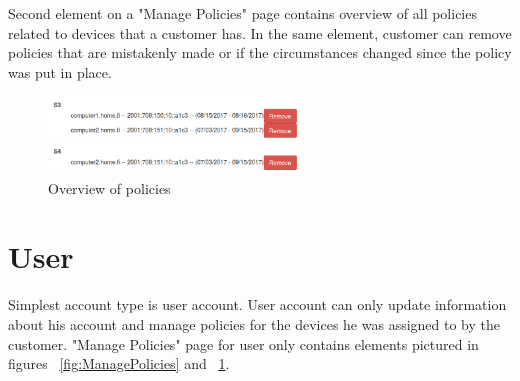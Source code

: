 Second element on a "Manage Policies" page contains overview of all policies related to devices that a customer has. In the same element, customer can remove policies that are mistakenly made or if the circumstances changed since the policy was put in place.

\begin{figure}[ht]
	\begin{center}
		\includegraphics[width=0.6\textwidth]{images/implementation/PolicyOverview}
		\caption{Overview of policies}
		\label{fig:PolicyOverview}
	\end{center}
\end{figure}

\section{User}

Simplest account type is user account. User account can only update information about his account and manage policies for the devices he was assigned to by the customer. "Manage Policies" page for user only contains elements pictured in figures ~\ref{fig:ManagePolicies} and ~\ref{fig:PolicyOverview}.





